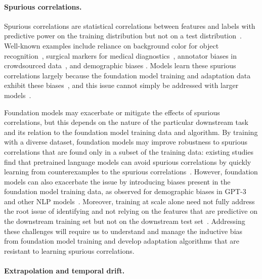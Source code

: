 \paragraph{Spurious correlations.} 
Spurious correlations are statistical correlations between features and labels with predictive power on the training distribution but not on a test distribution~\citep{heinze2017conditional, arjovsky2019invariant, sagawa2020group}.
Well-known examples include reliance on background color for object recognition~\citep{xiao2020noise}, surgical markers for medical diagnostics~\citep{winkler2019derm}, annotator biases in crowdsourced data~\citep{tsuchiya2018performance,gururangan2018annotation,poliak2018hypothesis,geva-etal-2019-modeling}, and demographic biases \citep{abid2021,stereoset,gehman-etal-2020-realtoxicityprompts}. 
Models learn these spurious correlations largely because the foundation model training and adaptation data exhibit these biases~\citep{nagarajan2020understanding,gehman-etal-2020-realtoxicityprompts}, and this issue cannot simply be addressed with larger models~\citep{sagawa2020overparameterization}.

Foundation models may exacerbate or mitigate the effects of spurious correlations, but this depends on the nature of the particular downstream task and its relation to the foundation model training data and algorithm. By training with a diverse dataset, foundation models may improve robustness to spurious correlations that are found only in a subset of the training data: \eg existing studies find that pretrained language models can avoid spurious correlations by quickly learning from counterexamples to the spurious correlations~\citep{tu2020empirical}.
However, foundation models can also exacerbate the issue by introducing biases present in the foundation model training data, as observed for demographic biases in GPT-3 and other NLP models~\citep{abid2021,stereoset,gehman-etal-2020-realtoxicityprompts}.
Moreover, training at scale alone need not fully address the root issue of identifying and not relying on the features that are predictive on the downstream training set but not on the downstream test set~\citep{heinze2017conditional}.
Addressing these challenges will require us to understand and manage the inductive bias from foundation model training and develop adaptation algorithms that are resistant to learning spurious correlations.

\paragraph{Extrapolation and temporal drift.} 

